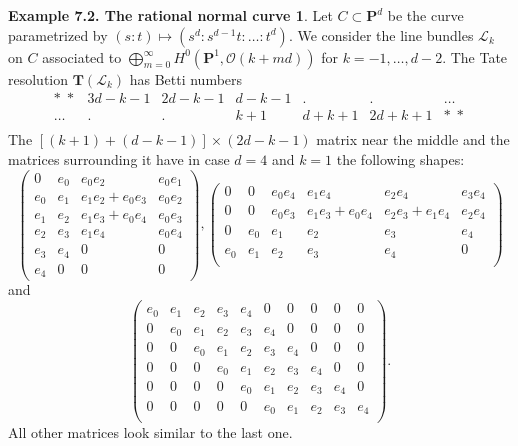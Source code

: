 \documentclass{tran-l}
\newcommand{\myP}{\mathbf{P}}
\newcommand{\TT}{\mathbf{T}}
\theoremstyle{plain}
\theoremstyle{remark}
\theoremstyle{definition}
\newtheorem*{definition4}{Example 7.2. The rational normal curve}
\begin{document}
\begin{definition4}
Let $C \subset \myP ^{d}$ be the
curve parame\-trized by $(s:t) \mapsto (s^{d}:s^{d-1}t:\ldots :t^{d})$. We consider
 the line bundles $\mathcal{L}_{k}$ on $C$ associated to
$\bigoplus _{m=0}^{\infty }H^{0}(\myP ^{1},\mathcal{O} (k+md))$ for $k=-1,\ldots ,d-2$. The Tate
resolution
$\TT (\mathcal{L}_{k})$ has Betti numbers
\begin{equation*}\begin{matrix}* \; * & 3d-k-1 & 2d-k-1 & d-k-1 & .     & .      &\ldots \\
         \ldots & .      & .      & k+1 & d+k+1 & 2d+k+1  &*\;* \\
\end{matrix}
\end{equation*}
The $[(k+1)+(d-k-1)] \times (2d-k-1)$ matrix near the middle and the matrices surrounding it
 have in case $d=4$ and $k=1$ the following shapes:
\begin{equation*}
\scriptscriptstyle {\left(\begin{matrix}
0&e_{0}&e_{0}e_{2}&e_{0}e_{1} \\
e_{0}&e_{1}&e_{1}e_{2}+e_{0}e_{3}&e_{0}e_{2} \\
e_{1}&e_{2}&e_{1}e_{3}+e_{0}e_{4}&e_{0}e_{3} \\
e_{2}&e_{3}&e_{1}e_{4}&e_{0}e_{4}\\
e_{3}&e_{4}&0&0\\
e_{4}&0&0&0\end{matrix}\right)}{\textstyle{,}}
\left(\begin{matrix}
0&0& e_{0}e_{4}& e_{1}e_{4}        &   e_{2}e_{4} & e_{3}e_{4} \\
0&0& e_{0}e_{3}& e_{1}e_{3}+e_{0}e_{4} & e_{2}e_{3}+e_{1}e_{4} & e_{2}e_{4} \\
0&e_{0}&e_{1}&e_{2}&e_{3}&e_{4}\\
e_{0}&e_{1}&e_{2}&e_{3}&e_{4}&0\\
\end{matrix}\right)
\end{equation*}
and
\begin{equation*}
\left(\begin{matrix}e_{0}&e_{1}&e_{2}&e_{3}&e_{4}&0&0&0&0&0\\
0&e_{0}&e_{1}&e_{2}&e_{3}&e_{4}&0&0&0&0\\
0&0&e_{0}&e_{1}&e_{2}&e_{3}&e_{4}&0&0&0\\
0&0&0&e_{0}&e_{1}&e_{2}&e_{3}&e_{4}&0&0\\
0&0&0&0&e_{0}&e_{1}&e_{2}&e_{3}&e_{4}&0\\
0&0&0&0&0&e_{0}&e_{1}&e_{2}&e_{3}&e_{4}\\
\end{matrix}\right).
\end{equation*}
All other matrices look similar to the last one.


\end{definition4}
\end{document}
